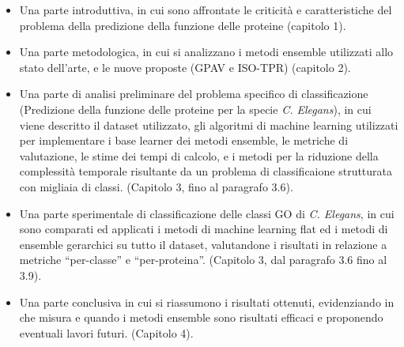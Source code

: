 \documentclass[12pt]{report}
\begin{document}
\begin{itemize}
\item Una parte introduttiva, in cui sono affrontate le criticit\`a e caratteristiche del problema della predizione della funzione delle proteine (capitolo 1). 
\item Una parte metodologica, in cui si analizzano i metodi ensemble utilizzati allo stato dell'arte, e le nuove proposte (GPAV e ISO-TPR) (capitolo 2).
\item Una parte di analisi preliminare del problema specifico di classificazione (Predizione della funzione delle proteine per la specie \emph{C. Elegans}), in cui viene descritto il dataset utilizzato, gli algoritmi di machine learning utilizzati per implementare i base learner dei metodi ensemble, le metriche di valutazione, le stime dei tempi di calcolo, e i metodi per la riduzione della complessit\`a temporale risultante da un problema di classificaione strutturata con migliaia di classi. (Capitolo 3, fino al paragrafo 3.6).
\item Una parte sperimentale di classificazione delle classi GO di \emph{C. Elegans}, in cui sono comparati ed applicati i metodi di machine learning flat ed i metodi di ensemble gerarchici su tutto il dataset, valutandone i risultati in relazione a metriche ``per-classe''  e ``per-proteina''. (Capitolo 3, dal paragrafo 3.6 fino al 3.9).
\item Una parte conclusiva in cui si riassumono i risultati ottenuti, evidenziando in che misura e quando i metodi ensemble sono risultati efficaci e proponendo eventuali lavori futuri. (Capitolo 4).
\end{itemize}
\end{document}
